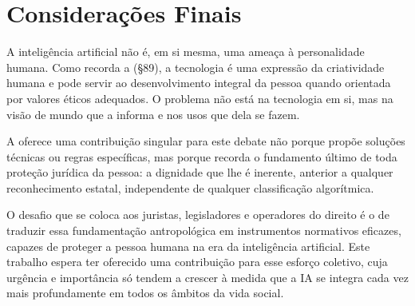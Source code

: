 \section{Considerações Finais}
\label{sec:consideracoes-finais}

A inteligência artificial não é, em si mesma, uma ameaça à personalidade humana. Como recorda a \MH{} (§89), a tecnologia é uma expressão da criatividade humana e pode servir ao desenvolvimento integral da pessoa quando orientada por valores éticos adequados. O problema não está na tecnologia em si, mas na visão de mundo que a informa e nos usos que dela se fazem.

A \MH{} oferece uma contribuição singular para este debate não porque propõe soluções técnicas ou regras específicas, mas porque recorda o fundamento último de toda proteção jurídica da pessoa: a dignidade que lhe é inerente, anterior a qualquer reconhecimento estatal, independente de qualquer classificação algorítmica.

O desafio que se coloca aos juristas, legisladores e operadores do direito é o de traduzir essa fundamentação antropológica em instrumentos normativos eficazes, capazes de proteger a pessoa humana na era da inteligência artificial. Este trabalho espera ter oferecido uma contribuição para esse esforço coletivo, cuja urgência e importância só tendem a crescer à medida que a IA se integra cada vez mais profundamente em todos os âmbitos da vida social.
